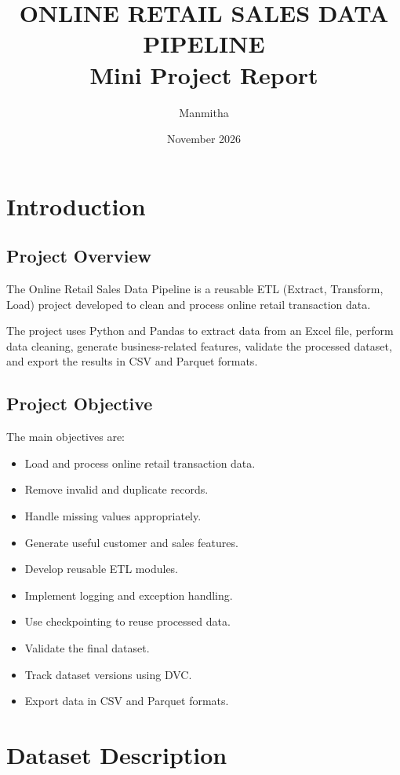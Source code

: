 \documentclass[12pt,a4paper]{report}
\title{
    \textbf{ONLINE RETAIL SALES DATA PIPELINE}\\
    \large Mini Project Report
}
\author{Manmitha}
\date{November 2026}
\begin{document}
\maketitle

\tableofcontents
\newpage

\chapter{Introduction}

\section{Project Overview}

The Online Retail Sales Data Pipeline is a reusable
ETL (Extract, Transform, Load) project developed to
clean and process online retail transaction data.

The project uses Python and Pandas to extract data
from an Excel file, perform data cleaning, generate
business-related features, validate the processed
dataset, and export the results in CSV and Parquet
formats.

\section{Project Objective}

The main objectives are:

\begin{itemize}
    \item Load and process online retail transaction data.
    \item Remove invalid and duplicate records.
    \item Handle missing values appropriately.
    \item Generate useful customer and sales features.
    \item Develop reusable ETL modules.
    \item Implement logging and exception handling.
    \item Use checkpointing to reuse processed data.
    \item Validate the final dataset.
    \item Track dataset versions using DVC.
    \item Export data in CSV and Parquet formats.
\end{itemize}

\chapter{Dataset Description}
\end{document}
